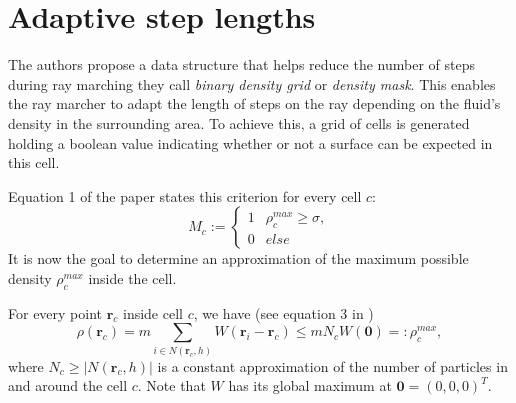 \section{Adaptive step lengths}

The authors propose a data structure that helps reduce the number of steps during ray marching they call \textit{binary density grid} or \textit{density mask}. This enables the ray marcher to adapt the length of steps on the ray depending on the fluid's density in the surrounding area. To achieve this, a grid of cells is generated holding a boolean value indicating whether or not a surface can be expected in this cell.

Equation 1 of the paper states this criterion for every cell $c$:
\[
M_c := \begin{cases}
1 & \rho_c^{max} \geq \sigma, \\
0 & else
\end{cases}
\]
It is now the goal to determine an approximation of the maximum possible density $\rho_c^{max}$ inside the cell.

For every point $\textbf{r}_c$ inside cell $c$, we have (see equation 3 in \cite{Wu:2022})
\[
\rho(\textbf{r}_c) =
m \sum_{i \in N(\textbf{r}_c, h)} W(\textbf{r}_i - \textbf{r}_c) \leq
m N_c W(\textbf{0}) =: \rho_c^{max},
\]
where $N_c \geq |N(\textbf{r}_c, h)|$ is a constant approximation of the number of particles in and around the cell $c$. Note that $W$ has its global maximum at $\textbf{0} = (0, 0, 0)^T$.

